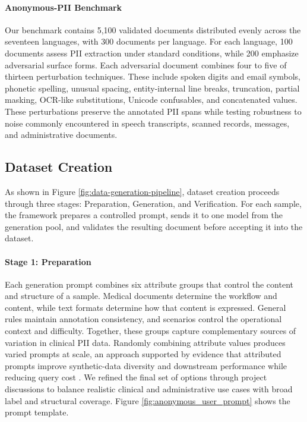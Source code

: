 \documentclass[11pt]{article}
\begin{document}
\paragraph{Anonymous-PII Benchmark} Our benchmark contains 5,100 validated documents distributed evenly across the seventeen languages, with 300 documents per language. For each language, 100 documents assess PII extraction under standard conditions, while 200 emphasize adversarial surface forms. Each adversarial document combines four to five of thirteen perturbation techniques. These include spoken digits and email symbols, phonetic spelling, unusual spacing, entity-internal line breaks, truncation, partial masking, OCR-like substitutions, Unicode confusables, and concatenated values. These perturbations preserve the annotated PII spans while testing robustness to noise commonly encountered in speech transcripts, scanned records, messages, and administrative documents.

\subsection{Dataset Creation}

As shown in Figure \ref{fig:data-generation-pipeline}, dataset creation proceeds through three stages: Preparation, Generation, and Verification. For each sample, the framework prepares a controlled prompt, sends it to one model from the generation pool, and validates the resulting document before accepting it into the dataset.

\paragraph{Stage 1: Preparation} Each generation prompt combines six attribute groups that control the content and structure of a sample. Medical documents determine the workflow and content, while text formats determine how that content is expressed. General rules maintain annotation consistency, and scenarios control the operational context and difficulty. Together, these groups capture complementary sources of variation in clinical PII data. Randomly combining attribute values produces varied prompts at scale, an approach supported by evidence that attributed prompts improve synthetic-data diversity and downstream performance while reducing query cost \cite{yu2023large}. We refined the final set of options through project discussions to balance realistic clinical and administrative use cases with broad label and structural coverage. Figure \ref{fig:anonymous_user_prompt} shows the prompt template.
\end{document}

